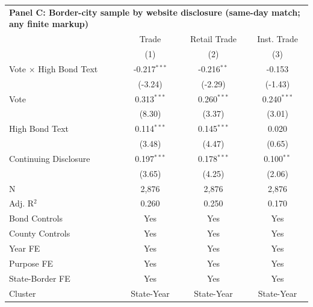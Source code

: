 \begingroup
\centering
\begin{tabular*}{\textwidth}{@{\extracolsep{\fill}}lccc}
\multicolumn{5}{l}{\textbf{Panel C: Border-city sample by website disclosure (same-day match; any finite markup)}}\\

\addlinespace
   \toprule
                                 & Trade          & Retail Trade  & Inst. Trade\\  
                                 & (1)            & (2)           & (3)\\  
   \midrule 
   Vote $\times$ High Bond Text  & -0.217$^{***}$ & -0.216$^{**}$ & -0.153\\   
                                 & (-3.24)       & (-2.29)      & (-1.43)\\   
   Vote                          & 0.313$^{***}$  & 0.260$^{***}$ & 0.240$^{***}$\\   
                                 & (8.30)        & (3.37)       & (3.01)\\   
   High Bond Text                & 0.114$^{***}$  & 0.145$^{***}$ & 0.020\\   
                                 & (3.48)        & (4.47)       & (0.65)\\   
   Continuing Disclosure         & 0.197$^{***}$  & 0.178$^{***}$ & 0.100$^{**}$\\   
                                 & (3.65)        & (4.25)       & (2.06)\\   
   \hline
   N                  & 2,876          & 2,876         & 2,876\\  
   Adj. R$^2$                & 0.260          & 0.250         & 0.170\\  
   Bond Controls                 & Yes            & Yes           & Yes\\  
   County Controls               & Yes            & Yes           & Yes\\  
   Year FE                       & Yes            & Yes           & Yes\\  
   Purpose FE                    & Yes            & Yes           & Yes\\  
   State-Border FE               & Yes            & Yes           & Yes\\  
   Cluster              & State-Year & State-Year & State-Year\\  
   \bottomrule
\end{tabular*}
\par\endgroup
